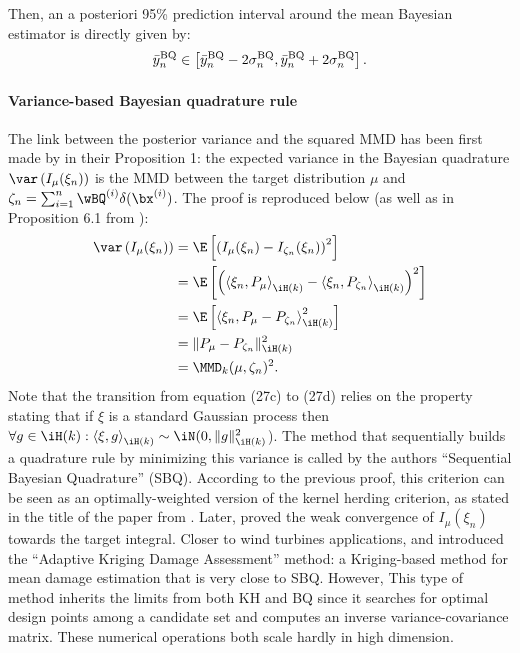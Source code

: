\noindent Then, an a posteriori 95\% prediction interval around the mean Bayesian estimator is directly given by: 
\begin{equation}
   \Bar{y}_n^{\mathrm{BQ}} \in \left[\Bar{y}_n^{\mathrm{BQ}} - 2\sigma_n^{\mathrm{BQ}}, \Bar{y}_n^{\mathrm{BQ}} + 2\sigma_n^{\mathrm{BQ}} \right].
\end{equation}

\paragraph{Variance-based Bayesian quadrature rule}%
The link between the posterior variance and the squared MMD has been first made by \cite{husar_duvenaud_2012} in their Proposition 1: the expected variance in the Bayesian quadrature $\var\left(I_{\mu}(\xi_n)\right)$ is the MMD between the target distribution $\mu$ and $\zeta_n = \sum_{i=1}^n \wBQ^{(i)} \delta(\bx^{(i)})$. 
The proof is reproduced below (as well as in Proposition 6.1 from \cite{motonobu_2018}): %
\begin{subequations}
\begin{align}
    \var\left(I_{\mu}(\xi_n)\right) &= \E\left[ \left(I_{\mu}(\xi_n) - I_{\zeta_n}(\xi_n)\right)^2\right]\\
    &= \E\left[ \left( \left\langle \xi_n, P_{\mu} \right\rangle_{\iH(k)} - \left\langle \xi_n, P_{\zeta_n}\right\rangle_{\iH(k)} \right)^2\right]\\
    &= \E\left[ \left\langle \xi_n, P_{\mu} - P_{\zeta_n} \right\rangle_{\iH(k)}^2\right]\\
    &= \lVert P_{\mu} - P_{\zeta_n} \lVert^2_{\iH(k)}\\ 
    &= \MMD_k(\mu, \zeta_n)^2.
\end{align}
\end{subequations}
Note that the transition from equation (27c) to (27d) relies on the property stating that if $\xi$ is a standard Gaussian process then $\forall g \in \iH(k) : \left\langle \xi, g \right\rangle_{\iH(k)} \sim \iN(0, \lVert g \lVert^2_{\iH(k)}$). 
The method that sequentially builds a quadrature rule by minimizing this variance is called by the authors ``Sequential Bayesian Quadrature'' (SBQ). 
According to the previous proof, this criterion can be seen as an optimally-weighted version of the kernel herding criterion, as stated in the title of the paper from \cite{husar_duvenaud_2012}. 
Later, \cite{briol_2015} proved the weak convergence of $I_{\mu}(\xi_n)$ towards the target integral. 
Closer to wind turbines applications, \cite{huchet_2019} and \cite{huchet_mattrand_2019} introduced the ``Adaptive Kriging Damage Assessment'' method: a Kriging-based method for mean damage estimation that is very close to SBQ. 
However, This type of method inherits the limits from both KH and BQ since it searches for optimal design points among a candidate set and computes an inverse variance-covariance matrix. 
These numerical operations both scale hardly in high dimension. 

